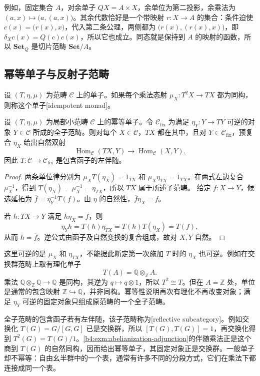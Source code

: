 例如，固定集合 \(A\)，对余单子 \(QX=A\times X\)，余单位为第二投影，余乘法为 \((a,x)\mapsto\bigl(a,(a,x)\bigr)\)。其余代数恰好是一个带映射 \(r:X\to A\) 的集合：条件迫使 \(c(x)=\bigl(r(x),x\bigr)\)，代入第二条公理，两侧都为 \(\bigl(r(x),(r(x),x)\bigr)\)，即 \(\delta_Xc(x)=Q(c)c(x)\)，所以它也成立。同态就是保持到 \(A\) 的映射的函数，所以 \(\mathbf{Set}_Q\) 是切片范畴 \(\mathbf{Set}/A\)。

\subsection{幂等单子与反射子范畴}
\label{b4:subsec:A01:03}

\begin{definition}\label{b4:def:A-idempotent-monad}
	设 \((T,\eta,\mu)\) 为范畴 \(\mathcal C\) 上的单子。如果每个乘法态射 \(\mu_X:T^2X\to TX\) 都为同构，则称这个单子[idempotent monad]。
\end{definition}

\begin{proposition}\label{b4:prop:A-idempotent-reflection}
	设 \((T,\eta,\mu)\) 为局部小范畴 \(\mathcal C\) 上的幂等单子。令 \(\mathcal C_{\mathrm{fix}}\) 为满足 \(\eta_Y:Y\to TY\) 可逆的对象 \(Y\in\mathcal C\) 所成的全子范畴。则对每个 \(X\in\mathcal C\)，\(TX\) 都在其中，且对 \(Y\in\mathcal C_{\mathrm{fix}}\)，预复合 \(\eta_X\) 给出自然双射
	\[
		\operatorname{Hom}_{\mathcal C}(TX,Y) \longrightarrow\operatorname{Hom}_{\mathcal C}(X,Y).
	\]
	因此 \(T:\mathcal C\to\mathcal C_{\mathrm{fix}}\) 是包含函子的左伴随。
\end{proposition}
\begin{proof}
	两条单位律分别为 \(\mu_XT(\eta_X)=1_{TX}\) 和 \(\mu_X\eta_{TX}=1_{TX}\)。在两式左边复合 \(\mu_X^{-1}\)，得到 \(T(\eta_X)=\mu_X^{-1}=\eta_{TX}\)，所以 \(TX\) 属于所述子范畴。 给定 \(f:X\to Y\)，候选延拓为 \(\overline f=\eta_Y^{-1}T(f)\)。由 \(\eta\) 的自然性，\(\overline f\eta_X=f\)。

	若 \(h:TX\to Y\) 满足 \(h\eta_X=f\)，则
	\[
		\eta_Yh=T(h)\eta_{TX} =T(h)T(\eta_X)=T(f),
	\]
	从而 \(h=\overline f\)。逆公式由函子及自然变换的复合组成，故对 \(X,Y\) 自然。
\end{proof}

这里可逆的是 \(\mu_X\) 和 \(\eta_{TX}\)，不能据此断定第一次施加 \(T\) 时的 \(\eta_X\) 也可逆。例如在交换群范畴上取有理化单子
\[
	T(A)=\mathbb Q\otimes_{\mathbb Z}A.
\]
乘法 \(\mathbb Q\otimes_{\mathbb Z}\mathbb Q\longrightarrow\mathbb Q\) 是同构，其逆为 \(q\mapsto q\otimes1\)，所以 \(T^2\cong T\)。但在 \(A=\mathbb Z\) 处，单位是通常的包含映射 \(\mathbb Z\hookrightarrow\mathbb Q\)，并非同构。幂等性说明再次有理化不再改变对象；满足 \(\eta_Y\) 可逆的固定对象只组成原范畴的一个全子范畴。

\ProseParagraphBreak

全子范畴的包含函子若有左伴随，该子范畴称为[reflective subcategory]。例如交换化 \(T(G)=G/[G,G]\) 已是交换群，所以 \([T(G),T(G)]=1\)，再交换化得到 \(T^2(G)=T(G)/1\)。\cref{b4:exm:abelianization-adjunction}的伴随乘法正是这个商到 \(T(G)\) 的自然同构，因而给出幂等单子，其固定对象正是交换群。一般单子却不幂等：自由幺半群中的一个表，通常有许多不同的分段方式，它们在乘法下都连接成同一个表。
